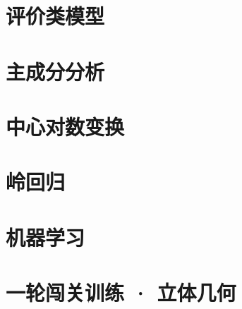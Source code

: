 \documentclass[lang=cn,10pt,color=cyan,titlestyle=hang,device=normal]{elegantbook}
\begin{document}
\chapter{评价类模型}




\chapter{主成分分析}


\chapter{中心对数变换}


\chapter{岭回归}


\chapter{机器学习}

\chapter{一轮闯关训练 · 立体几何}

\end{document}
